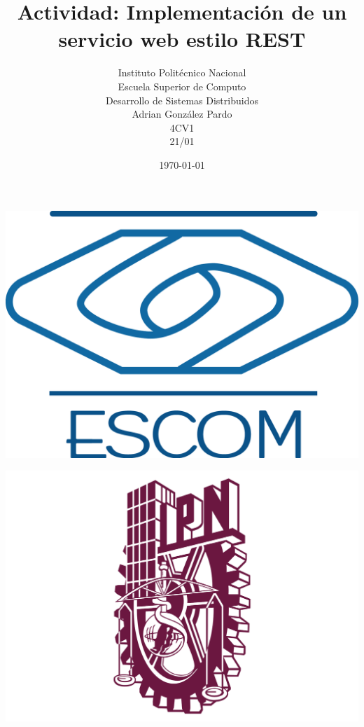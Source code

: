 \documentclass[10pt,executivepaper]{article}
\title{Actividad: Implementación de un servicio web estilo REST}
\author{Instituto Politécnico Nacional\\Escuela Superior de Computo\\Desarrollo de Sistemas Distribuidos\\Adrian González Pardo\\4CV1\\21/01}
\date{\today}
\begin{document}
\begin{minipage}{0.4\textwidth}
	\begin{flushleft}
		\includegraphics[scale = 0.05]{logoescom.png}
	\end{flushleft}
\end{minipage}
\begin{minipage}{0.51\textwidth}
	\begin{flushright}
		\includegraphics[scale = 0.055]{logoipn.png}
	\end{flushright}
\end{minipage}
\end{document}
